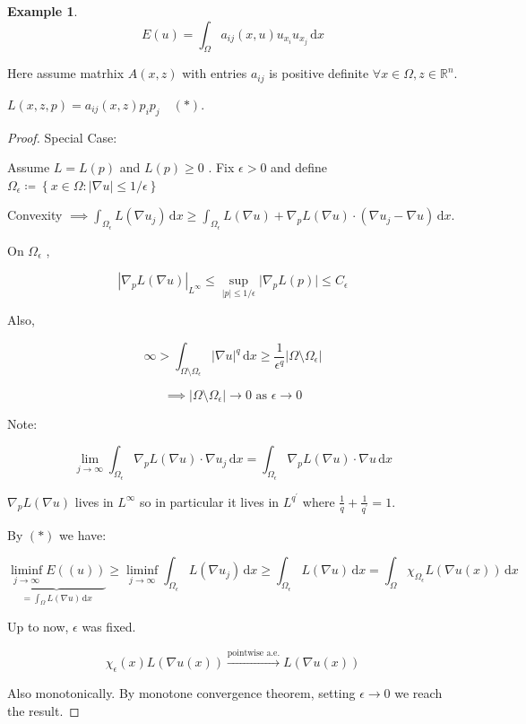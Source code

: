 \documentclass{article}
\theoremstyle{definition}
\newtheorem{example}{Example}
\begin{document}
\begin{example}
    \[
        E(u) = \int_{\Omega} a_{ij} (x,u) u_{x_i} u_{x_j} \,\mathrm{d}x 
    \]

    Here assume matrhix \(A(x,z)\) with entries \(a_{ij}\) is positive definite \(\forall x\in \Omega , z\in \mathbb{R}^n\).

    \(L(x,z,p) = a_{ij} (x,z) p_i p_j \quad (\ast)\).

\end{example}

\begin{proof}
    Special Case:

    Assume \(L = L(p)\) and \(L(p) \geq 0\) . Fix \(\epsilon > 0\) and define \(\Omega_{\epsilon} \coloneqq \left\{ x\in \Omega : \vert \nabla u \vert \leq 1 / \epsilon \right\} \) 

    Convexity \(\implies \int_{\Omega_{\epsilon}} L(\nabla u_j) \,\mathrm{d}x \geq \int_{\Omega_{\epsilon}} L(\nabla u) + \nabla_p L(\nabla u) \cdot (\nabla u_j - \nabla u) \,\mathrm{d}x \).
    
    On \(\Omega_{\epsilon}\) ,

    \[
        \left\vert \nabla_p L(\nabla u) \right\vert _{L^{\infty}} \leq \sup_{\vert p \vert \leq 1 / \epsilon} \vert \nabla_p L(p) \vert \leq C_{\epsilon}  
    \]

    Also,

    \[
        \infty > \int_{\Omega \setminus \Omega_{\epsilon} } \vert \nabla u \vert ^q \,\mathrm{d}x \geq \frac{1}{\epsilon^q} \vert \Omega \setminus \Omega_{\epsilon} \vert
    \]

    \[
        \implies \vert \Omega \setminus \Omega_{\epsilon} \vert \to 0 \text{ as } \epsilon \to 0
    \]

    Note:

    \[
        \lim_{j \to \infty} \int_{\Omega_{\epsilon}} \nabla_p L(\nabla u) \cdot \nabla u_j \,\mathrm{d}x = \int_{\Omega_{\epsilon}} \nabla_p L(\nabla u) \cdot \nabla u \,\mathrm{d}x 
    \]

    \(\nabla_p L(\nabla u)\) lives in \(L^{\infty}\) so in particular it lives in \(L^{q^{\prime}}\) where \(\frac{1}{q} + \frac{1}{q^{\prime}} = 1\). 

    By \((\ast)\) we have:

    \[
        \underbrace{\liminf_{j \to \infty} E((u))}_{= \int_{\Omega} L(\nabla u) \,\mathrm{d}x } \geq \liminf_{j \to \infty} \int_{\Omega_{\epsilon}} L(\nabla u_j) \,\mathrm{d}x \geq \int_{\Omega_{\epsilon}} L(\nabla u) \,\mathrm{d}x = \int_{\Omega} \chi_{\Omega_{\epsilon}} L(\nabla u(x)) \,\mathrm{d}x 
    \] 

    Up to now, \(\epsilon\) was fixed.

    \[
        \chi_{\epsilon} (x) L(\nabla u(x)) \overset{\text{pointwise a.e.}}{\to} L(\nabla u(x))
    \]

    Also monotonically. By monotone convergence theorem, setting \(\epsilon \to 0\) we reach the result.

\end{proof}
\end{document}
